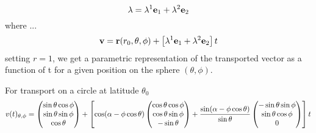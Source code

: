 $$
   \lambda = \lambda^1 \mathbf{e}_1 + \lambda^2 \mathbf{e}_2
$$
where ...
$$
   \mathbf{v} = \mathbf{r}(r_0, \theta, \phi) + \left[ \lambda^1 \mathbf{e}_1 + \lambda^2 \mathbf{e}_2 \right]t
$$
setting $r=1$, we get a parametric representation of the 
transported vector  as a function of t for a given position on the sphere $(\theta, \phi)$.

For transport on a circle at latitude $\theta_0$
$$
v(t)_{\theta,\phi}= \begin{pmatrix}
                      \sin\theta\cos\phi \\
                      \sin\theta\sin\phi \\
                      \cos\theta 
                    \end{pmatrix}
   + \left[ \cos(\alpha -\phi\cos\theta) \begin{pmatrix}
                      \cos\theta\cos\phi \\
                      \cos\theta\sin\phi \\
                      -\sin\theta 
                    \end{pmatrix}
   +  \frac{\sin(\alpha-\phi\cos\theta)}{\sin\theta} \begin{pmatrix}
                      -\sin\theta\sin\phi \\
                      \sin\theta\cos\phi \\
                      0 
                    \end{pmatrix}
      \right] t
$$

